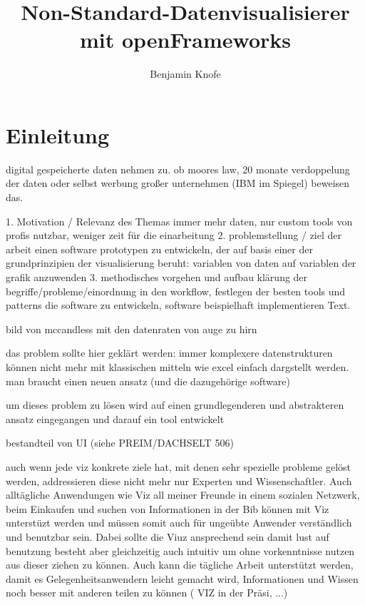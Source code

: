 \documentclass[a4paper, 12pt, onepage, pdftex, headsepline, footsepline]{scrreprt}
\begin{document}
\title{Non-Standard-Datenvisualisierer mit openFrameworks}
\author{Benjamin Knofe}
\subject{Diplomarbeit}
\publishers{Hochschule für Technik, Wirtschaft und Kultur Leipzig}
\dedication{viele nette Leute}
\maketitle
\tableofcontents
\chapter{Einleitung}
\label{sec:testi}

digital gespeicherte daten nehmen zu.
ob moores law, 20 monate verdoppelung der daten oder selbst werbung großer unternehmen (IBM im Spiegel) beweisen das.

1. Motivation / Relevanz des Themas
immer mehr daten, nur custom tools von profis nutzbar, weniger zeit für die einarbeitung
2. problemstellung / ziel der arbeit
einen software prototypen zu entwickeln, der auf basis einer der grundprinzipien der visualisierung beruht: variablen von daten auf variablen der grafik anzuwenden
3. methodisches vorgehen und aufbau
klärung der begriffe/probleme/einordnung in den workflow, festlegen der besten tools und patterns die software zu entwickeln, software beispielhaft implementieren Text.

bild von mccandless mit den datenraten von auge zu hirn

das problem sollte hier geklärt werden:
immer komplexere datenstrukturen können nicht mehr mit klassischen mitteln wie excel einfach dargstellt werden. man braucht einen neuen ansatz (und die dazugehörige software)

um dieses problem zu lösen wird auf einen grundlegenderen und abstrakteren ansatz eingegangen und darauf ein tool entwickelt

bestandteil von UI (siehe PREIM/DACHSELT 506)

auch wenn jede viz konkrete ziele hat, mit denen sehr spezielle probleme gelöst werden, addressieren diese nicht mehr nur Experten und Wissenschaftler. Auch alltägliche Anwendungen wie Viz all meiner Freunde in einem sozialen Netzwerk, beim Einkaufen und suchen von Informationen in der Bib können mit Viz unterstüzt werden und müssen somit auch für ungeübte Anwender verständlich und benutzbar sein. Dabei sollte die Viuz ansprechend sein damit lust auf benutzung besteht aber gleichzeitig auch intuitiv um ohne vorkenntnisse nutzen aus dieser ziehen zu können.
Auch kann die tägliche Arbeit unterstützt werden, damit es Gelegenheitsanwendern leicht gemacht wird, Informationen und Wissen noch besser mit anderen teilen zu können ( VIZ in der Präsi, ...)
\end{document}
